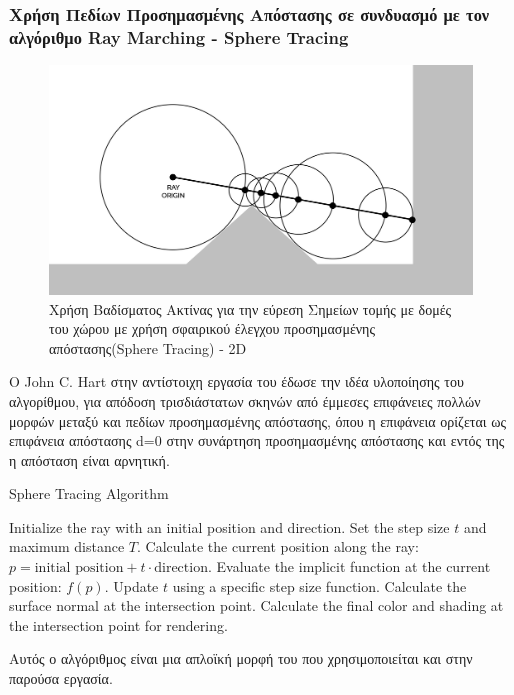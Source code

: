 \subsubsection{Χρήση Πεδίων Προσημασμένης Απόστασης σε συνδυασμό με τον αλγόριθμο Ray Marching - Sphere Tracing}
    \begin{figure}[H]
        \centering
        \includegraphics[width=.4\linewidth]{images/chapter2_img/Visualization_of_SDF_ray_marching_algorithm.jpg}
        \caption{\small{Χρήση Βαδίσματος Ακτίνας για την εύρεση Σημείων τομής με δομές του χώρου με χρήση σφαιρικού έλεγχου προσημασμένης απόστασης(Sphere Tracing) - 2D}}
        \label{fig:Ray Marching Vizualization Sphere Tracing}
    \end{figure}

O  John C. Hart στην αντίστοιχη εργασία του \cite{JohnHartSphereTracing} έδωσε την ιδέα υλοποίησης του αλγορίθμου, για απόδοση τρισδιάστατων σκηνών από έμμεσες επιφάνειες πολλών μορφών μεταξύ και πεδίων προσημασμένης απόστασης, όπου η επιφάνεια ορίζεται ως επιφάνεια απόστασης d=0 στην συνάρτηση προσημασμένης απόστασης και εντός της η απόσταση είναι αρνητική. 
\begin{algorithm}[H]
\caption{Sphere Tracing Algorithm}
\begin{algorithmic}
\State Initialize the ray with an initial position and direction.
\State Set the step size $t$ and maximum distance $T$.
    \State Calculate the current position along the ray: $p = \text{initial position} + t \cdot \text{direction}$.
    \State Evaluate the implicit function at the current position: $f(p)$.
    \EndIf
    \State Update $t$ using a specific step size function.
\EndWhile
\State Calculate the surface normal at the intersection point.
\State Calculate the final color and shading at the intersection point for rendering.
\end{algorithmic}
\end{algorithm}
Αυτός ο αλγόριθμος είναι μια απλοϊκή μορφή του  που χρησιμοποιείται και στην παρούσα εργασία.

